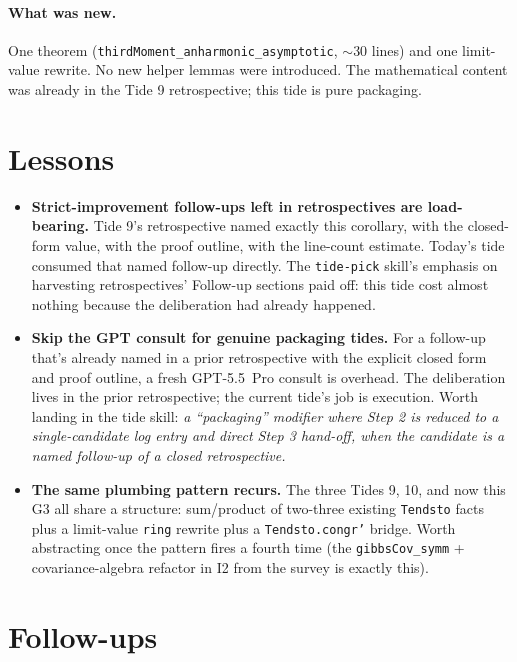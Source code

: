 \documentclass[11pt]{article}
\begin{document}
\paragraph{What was new.} One theorem
(\texttt{thirdMoment\_anharmonic\_asymptotic}, $\sim$30 lines) and one
limit-value rewrite. No new helper lemmas were introduced. The
mathematical content was already in the Tide 9 retrospective; this
tide is pure packaging.

\section{Lessons}

\begin{itemize}
\item \textbf{Strict-improvement follow-ups left in retrospectives are
load-bearing.} Tide 9's retrospective named exactly this corollary,
with the closed-form value, with the proof outline, with the line-count
estimate. Today's tide consumed that named follow-up directly. The
\texttt{tide-pick} skill's emphasis on harvesting retrospectives'
Follow-up sections paid off: this tide cost almost nothing because
the deliberation had already happened.

\item \textbf{Skip the GPT consult for genuine packaging tides.} For a
follow-up that's already named in a prior retrospective with the
explicit closed form and proof outline, a fresh GPT-5.5~Pro consult is
overhead. The deliberation lives in the prior retrospective; the
current tide's job is execution. Worth landing in the tide skill: \emph{a
``packaging'' modifier where Step 2 is reduced to a single-candidate
log entry and direct Step 3 hand-off, when the candidate is a named
follow-up of a closed retrospective.}

\item \textbf{The same plumbing pattern recurs.} The three Tides 9, 10,
and now this G3 all share a structure: sum/product of two-three
existing \texttt{Tendsto} facts plus a limit-value \texttt{ring}
rewrite plus a \texttt{Tendsto.congr'} bridge. Worth abstracting once
the pattern fires a fourth time (the \texttt{gibbsCov\_symm} +
covariance-algebra refactor in I2 from the survey is exactly this).
\end{itemize}

\section{Follow-ups}
\end{document}

